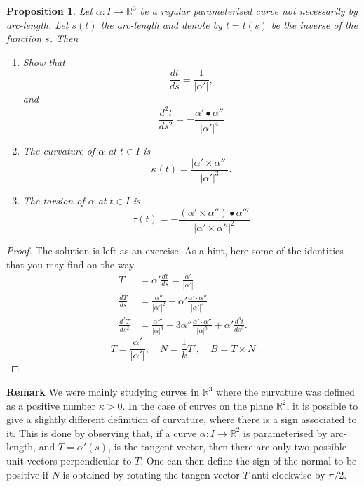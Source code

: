 \documentclass{amsart}
\newtheorem{prop}{Proposition}
\begin{document}
\begin{prop}
Let \(\alpha: I \to \mathbb{R}^3\) be a regular parameterised curve not necessarily by arc-length. Let \(s(t)\) the arc-length and denote by  \(t = t(s)\) be the inverse of the function \(s\). Then
\begin{enumerate}
\item Show that \[\frac{dt}{ds} = \frac{1}{|\alpha'|},\] and \[\frac{d^2t}{ds^2} = - \frac{\alpha'\bullet \alpha''}{|\alpha'|^4} \]
\item The curvature of \(\alpha\) at \(t\in I\) is \[ \kappa(t) = \frac{|\alpha' \times \alpha''|}{|\alpha'|^3}. \]
\item The torsion of \(\alpha\) at \(t \in I\) is \[ \tau(t) = -\frac{(\alpha' \times \alpha'')\bullet \alpha'''}{|\alpha' \times \alpha ''|^2} \]
\end{enumerate}
\end{prop}
\begin{proof}
The solution is left as an exercise. As a hint, here some of the identities that you may find on the way.
\begin{equation} \begin{split} T &=
\alpha' \frac{dt}{ds} =
\frac{\alpha'}{|\alpha'|}\\ \frac{dT}{ds}&=\frac{\alpha''}{|\alpha'|^2} -
\alpha' \frac{\alpha'\cdot\alpha''}{|\alpha'|^4}\\ \frac{d^2T}{ds^2}&=
\frac{\alpha'''}{|\alpha|^3} -
3\alpha''\frac{\alpha'\cdot\alpha''}{|\alpha|^5} +
\alpha'\frac{d^3t}{ds^3}. \end{split}
\end{equation} \begin{equation} T = \frac{\alpha'}{|\alpha'|},
\quad N = \frac{1}{k}T' , \quad B = T\times N
\end{equation} 
\end{proof}

\textbf{Remark} We were mainly studying curves in \(\mathbb{R}^3\) where the curvature was defined as a positive number \(\kappa >0\). In the case of curves on the plane \(\mathbb{R}^2\), it is possible to give a slightly different definition of curvature, where there is a sign associated to it. This is done by observing that, if a curve \(\alpha : I \to \mathbb{R}^2\) is 
parameterised by arc-length, and \(T = \alpha'(s)\), is the tangent vector, then there are only two possible unit vectors perpendicular to \(T\). One can then define the sign of the normal to be positive if \(N\) is obtained by rotating the tangen vector \(T\) anti-clockwise by \(\pi/2\).
\end{document}
